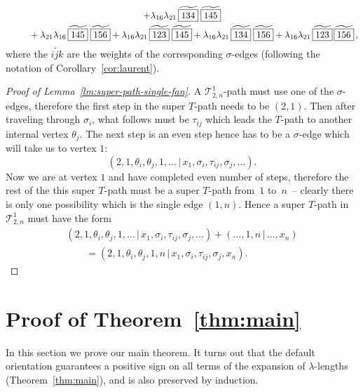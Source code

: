 \documentclass[pdftex]{sigma}
\numberwithin{equation}{section}
\begin{document}
\begin{Example}
\begin{gather*}
 + \lambda_{16}\lambda_{21} \, \widetilde{\boxed{134}} \; \widetilde{\boxed{145} }\\
 \hphantom{\lambda_{26} =}{}
 + \lambda_{21}\lambda_{16}\, \widetilde{\boxed{145}} \; \widetilde{\boxed{156} }
 + \lambda_{16}\lambda_{21} \, \widetilde{\boxed{123}} \; \widetilde{ \boxed{145}}
 + \lambda_{16}\lambda_{21} \, \widetilde{\boxed{134}}\;\widetilde{\boxed{156}}
 + \lambda_{16}\lambda_{21}\,
 \widetilde{ \boxed{123} }\, \widetilde{ \boxed{156}}\,,
 \end{gather*}
 where the $\widetilde{\boxed{ijk}}$ are the weights of the corresponding $\sigma$-edges (following the notation of Corollary~\ref{cor:laurent}).
\end{Example}

\begin{proof}[Proof of Lemma~\ref{lm:super-path-single-fan}]
 A $\mathcal T^1_{2,n}$-path must use one of the $\sigma$-edges, therefore the first step in the super $T$-path needs to be $(2,1)$.
 Then after traveling through $\sigma_i$, what follows must be $\tau_{ij}$ which leads the $T$-path to another internal vertex $\theta_j$.
 The next step is an even step hence has to be a $\sigma$-edge which will take us to vertex $1$:
 \[(2,1,\theta_i,\theta_j,1,\dots\,|\,x_1,\sigma_i,\tau_{ij},\sigma_j,\dots).\]
 Now we are at vertex $1$ and have completed even number of steps, therefore the rest of the this super $T$-path must be a super $T$-path
 from~$1$ to~$n$~-- clearly there is only one possibility which is the single edge $(1,n)$.
 Hence a super $T$-path in $\mathcal T^1_{2,n}$ must have the form
 \begin{gather*}
 (2,1,\theta_i,\theta_j,1,\dots\,|\,x_1,\sigma_i,\tau_{ij},\sigma_j,\dots)+(\dots,1,n\,|\,\dots,x_n)\\
 \qquad{} =(2,1,\theta_i,\theta_j,1,n\,|\,x_1,\sigma_i,\tau_{ij},\sigma_j,x_n).\tag*{\qed}
 \end{gather*}\renewcommand{\qed}{}
\end{proof}

\section{Proof of Theorem~\ref{thm:main}}
\label{sec:proof}

In this section we prove our main theorem.
It turns out that the default orientation guarantees a positive sign on all terms of the expansion of
$\lambda$-lengths (Theorem~\ref{thm:main}), and is also preserved by induction.
\end{document}
